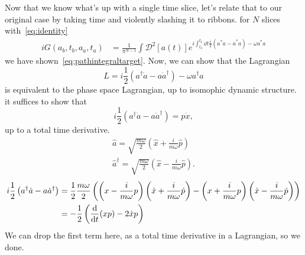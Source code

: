 \documentclass{article}
\newcommand{\msr}{\mathcal{D}}
\begin{document}
	Now that we know what's up with a single time slice, let's relate that to our original case by taking time and violently slashing it to ribbons.
	\triv for $N$ slices with~\eqref{eq:identity}
	\begin{align}
		i G(a_b, t_b, a_a, t_a) &= \frac{1}{\pi^{N - 1}} \int \msr^2[a(t)] e^{i \int_{t_a}^{t_b} \dd{t} \frac{i}{2} \left( a^\ast \dot{a} -  \dot{a}^\ast  a \right) - \omega a^\ast a}
	\end{align}
	\thrf we have shown~\eqref{eq:pathintegraltarget}.
	Now, we can show that the Lagrangian
	\begin{equation}
		L = i\frac12 \left(a^\dagger \dot{a} - a \dot{a}^\dagger \right) - \omega a^\dagger a
	\end{equation}
	is equivalent to the phase space Lagrangian, up to isomophic dynamic structure.
	\triv it suffices to show that
	\begin{equation}
		i\frac12 \left(a^\dagger \dot{a} - a \dot{a}^\dagger \right) = p \dot{x}, \label{eq:lagrangianconnection}
	\end{equation}
	up to a total time derivative.
	\triv
	\begin{align}
		\hat{a} = \sqrt{\frac{m \omega}{2}} \left(\hat{x} + \frac{i}{m \omega} \hat{p} \right) \\
		\hat{a}^\dagger = \sqrt{\frac{m \omega}{2}} \left(\hat{x} - \frac{i}{m \omega} \hat{p} \right).
	\end{align}
	\triv
	\begin{align}
		i\frac12 \left(a^\dagger \dot{a} - a \dot{a}^\dagger \right) &= \frac12 \frac{m \omega}{2} \left( \left( x - \frac{i}{m \omega} p \right)\left(\dot{x} + \frac{i}{m \omega} \dot{p} \right) - \left(x + \frac{i}{m \omega} p \right) \left(\dot{x} - \frac{i}{m \omega} \dot{p} \right)\right) \\
		&= - \frac12 \left( \dv{t}(x p) - 2 \dot{x} p \right)
	\end{align}
	We can drop the first term here, as a total time derivative in a Lagrangian, so we done.
\end{document}
